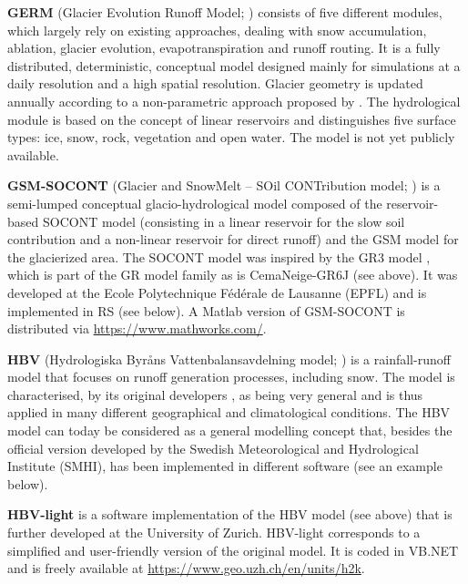 \documentclass[10pt,a4paper]{article}
\begin{document}
\textbf{GERM} (Glacier Evolution Runoff Model; \citealt{Huss2016, Farinotti2012}) consists of five different modules, which largely rely on existing approaches, dealing with snow accumulation, ablation, glacier evolution, evapotranspiration and runoff routing. It is a fully distributed, deterministic, conceptual model designed mainly for simulations at a daily resolution and a high spatial resolution. Glacier geometry is updated annually according to a non-parametric approach proposed by \citet{Huss2010}. The hydrological module is based on the concept of linear reservoirs and distinguishes five surface types: ice, snow, rock, vegetation and open water. The model is not yet publicly available.

\textbf{GSM-SOCONT} (Glacier and SnowMelt -- SOil CONTribution model; \citealp{Schaefli2005c}) is a semi-lumped conceptual glacio-hydrological model composed of the reservoir-based SOCONT model (consisting in a linear reservoir for the slow soil contribution and a non-linear reservoir for direct runoff) and the GSM model for the glacierized area. The SOCONT model was inspired by the GR3 model \citep{Edijatno1989}, which is part of the GR model family as is CemaNeige-GR6J (see above). It was developed at the Ecole Polytechnique Fédérale de Lausanne (EPFL) and is implemented in RS (see below). A Matlab version of GSM-SOCONT is distributed via \url{https://www.mathworks.com/}.

\textbf{HBV} (Hydrologiska Byråns Vattenbalansavdelning model; \citealp{Bergstrom1976a, Bergstrom1992, Bergstrom1995, Lindstrm1997})  is a rainfall-runoff model that focuses on runoff generation processes, including snow. The model is characterised, by its original developers \citep{Bergstrom1992}, as being very general and is thus applied in many different geographical and climatological conditions. The HBV model can today be considered as a general modelling concept that, besides the official version developed by the Swedish Meteorological and Hydrological Institute (SMHI), has been implemented in different software (see an example below).

\textbf{HBV-light} \citep{Seibert2012} is a software implementation of the HBV model (see above) that is further developed at the University of Zurich. HBV-light corresponds to a simplified and user-friendly version of the original model. It is coded in VB.NET and is freely available at \url{https://www.geo.uzh.ch/en/units/h2k}.
\end{document}

